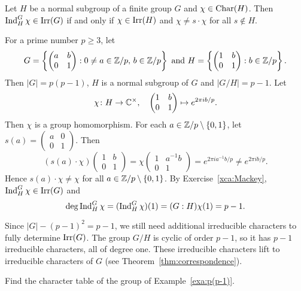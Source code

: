 \begin{exercise}
\label{xca:Mackey}
    Let $H$ be a normal subgroup of a finite group $G$ and $\chi\in\operatorname{Char}(H)$.
    Then $\operatorname{Ind}_H^G\chi\in\operatorname{Irr}(G)$ if and only if $\chi\in\operatorname{Irr}(H)$ and $\chi\ne s\cdot\chi$ 
    for all $s\not\in H$. 
\end{exercise}

\begin{example}
\label{exa:p(p-1)}
    For a prime number $p\geq3$, let 
    \[
        G=\left\{\begin{pmatrix}a&b\\0&1\end{pmatrix}:0\ne a\in\mathbb{Z}/p,\,b\in\mathbb{Z}/p\right\}\text{ and }
        H=\left\{\begin{pmatrix}1&b\\0&1\end{pmatrix}:b\in\mathbb{Z}/p\right\}.
    \]
    Then $|G|=p(p-1)$, $H$ is a normal subgroup of $G$ and $|G/H|=p-1$. Let 
    \[
    \chi\colon H\to\mathbb{C}^{\times},\quad\begin{pmatrix}1&b\\0&1\end{pmatrix}\mapsto e^{2\pi ib/p}.
    \]
    Then $\chi$ is a group homomorphism. For each $a\in\mathbb{Z}/p\setminus\{0,1\}$, let $s(a)=\begin{pmatrix}a&0\\0&1\end{pmatrix}$. Then 
    \[
    (s(a)\cdot\chi)\begin{pmatrix}1&b\\0&1\end{pmatrix}=\chi\begin{pmatrix}1&a^{-1}b\\0&1\end{pmatrix}=e^{2\pi ia^{-1}b/p}
    \ne e^{2\pi ib/p}.
    \]
    Hence $s(a)\cdot\chi\ne\chi$ for all $a\in\mathbb{Z}/p\setminus\{0,1\}$. By Exercise~\ref{xca:Mackey}, 
    $\operatorname{Ind}_H^G\chi\in\operatorname{Irr}(G)$ and 
    \[
    \deg\operatorname{Ind}_H^G\chi=(\operatorname{Ind}_H^G\chi)(1)=(G:H)\chi(1)=p-1.
    \]
    
    Since 
    $|G|-(p-1)^2=p-1$, 
    we still need additional irreducible characters to fully determine $\operatorname{Irr}(G)$. 
    The group $G/H$ is cyclic of order $p-1$, so it has $p-1$ irreducible characters, all of degree one. 
    These irreducible characters lift to irreducible characters of $G$ (see Theorem~\ref{thm:correspondence}). 
\end{example}

\begin{bonus}
\label{xca:p(p-1)}
    Find the character table of the group of Example~\ref{exa:p(p-1)}. 
\end{bonus}